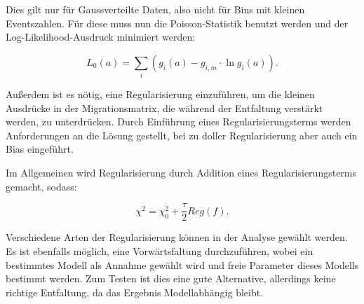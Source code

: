 Dies gilt nur für Gaussverteilte Daten, also nicht für Bins mit kleinen Eventszahlen.
Für diese muss nun die Poisson-Statistik benutzt werden und der Log-Likelihood-Ausdruck minimiert werden:

\begin{equation}
 L_0(a)=\sum_i (g_i(a)-g_{i,m}\cdot \ln g_i(a)).
\end{equation}

Außerdem ist es nötig, eine Regularisierung einzuführen, um die kleinen Ausdrücke in der Migrationsmatrix, die während der Entfaltung verstärkt werden, zu unterdrücken.
Durch Einführung eines Regularisierungsterms werden Anforderungen an die Lösung gestellt, bei zu doller Regularisierung aber auch ein Bias eingeführt.

Im Allgemeinen wird Regularisierung durch Addition eines Regularisierungsterms gemacht, sodass:

\begin{equation}
 \chi^2=\chi_0^2 +\frac{\tau}{2} Reg(f).
\end{equation}

Verschiedene Arten der Regularisierung können in der Analyse gewählt werden.
Es ist ebenfalls möglich, eine Vorwärtsfaltung durchzuführen, wobei ein bestimmtes Modell als Annahme gewählt wird und freie Parameter dieses Modells bestimmt werden.
Zum Testen ist dies eine gute Alternative, allerdings keine richtige Entfaltung, da das Ergebnis Modellabhängig bleibt.


